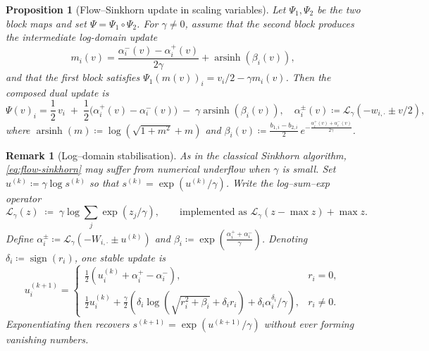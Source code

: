 \documentclass{article}
\theoremstyle{plain}
\newtheorem{proposition}{Proposition}[section]
\newtheorem{remark}{Remark}[section]
\newcommand{\length}{W}
\newcommand{\eqdef}{\coloneqq}
\newcommand{\Ll}{\mathcal{L}}
\DeclareMathOperator{\sign}{sign}
\DeclareMathOperator{\arsinh}{arsinh}
\newcommand{\z}{z}
\newcommand{\zC}{\z^C}
\begin{document}
\begin{proposition}[Flow--Sinkhorn update in scaling variables]
\label{prop:graphw1-flow-sinkhorn-update}
Let $\Psi_1,\Psi_2$ be the two block maps and set $\Psi=\Psi_1\circ\Psi_2$.
For $\gamma\neq0$, assume that the second block produces the intermediate log-domain update
\[
  m_i(v)
  =
  \frac{\alpha_i^-(v)-\alpha_i^+(v)}{2\gamma}
  +
  \arsinh(\beta_i(v)),
\]
and that the first block satisfies
$\Psi_1(m(v))_i=v_i/2-\gamma m_i(v)$.
Then the composed dual update is
\begin{equation}
\label{eq:v-update-stable}
  \Psi(v)_i
  =
  \frac{1}{2}\,v_i
  \;+\;\frac{1}{2}\bigl(\alpha_i^+(v)-\alpha_i^-(v)\bigr)
  \;-\;\gamma \arsinh(\beta_i(v)),
  \quad
  \alpha_i^\pm(v)\coloneqq \Ll_{\gamma}(-w_{i,\cdot} \pm v/2),
\end{equation}
where $\arsinh(m) \eqdef \log(\sqrt{1+m^2} + m)$ and 
$
	\beta_i(v) \eqdef \frac{b_{1,i}-b_{2,i}}{2}\,e^{-\frac{\alpha_i^+(v)+\alpha_i^-(v)}{2\gamma}}$.
\end{proposition}




\begin{remark}[Log--domain stabilisation]
\label{rem:log-stable}
As in the classical Sinkhorn algorithm, \eqref{eq:flow-sinkhorn} may suffer from numerical underflow when $\gamma$ is small.  
Set $u^{(k)}\eqdef\gamma\log s^{(k)}$ so that $s^{(k)}=\exp(u^{(k)}/\gamma)$.  
Write the log--sum--exp operator
\[
	\Ll_{\gamma}(z)\;\eqdef\;\gamma\log\!\sum_{j}\exp(z_{j}/\gamma),
	\qquad
	\text{implemented as } \Ll_{\gamma}(z-\max z)+\max z .
\]
Define 
$\alpha^{\pm}_{i}\eqdef\Ll_{\gamma}(-\length_{i,\cdot}\pm u^{(k)})$
and $\beta_{i}\eqdef\exp(\tfrac{\alpha^{+}_{i}+\alpha^{-}_{i}}{\gamma})$.  
Denoting $\delta_{i}\eqdef\sign(r_{i})$, one stable update is
\[
	u^{(k+1)}_{i}=
	\begin{cases}
		\tfrac12(u^{(k)}_{i}+\alpha^{+}_{i}-\alpha^{-}_{i}),
		    & r_{i}=0,\\[4pt]
		\tfrac12u^{(k)}_{i}
		+\tfrac{\gamma}{2}(
		      \delta_{i}\log(\sqrt{r_{i}^{2}+\beta_{i}}+\delta_{i}r_{i})
		      +\delta_{i}\alpha^{\delta_{i}}_{i}/\gamma
		    ),
		    & r_{i}\neq0.
	\end{cases}
\]
Exponentiating then recovers $s^{(k+1)}=\exp(u^{(k+1)}/\gamma)$ without ever forming vanishing numbers.
\end{remark}
\fi 
\end{document}
